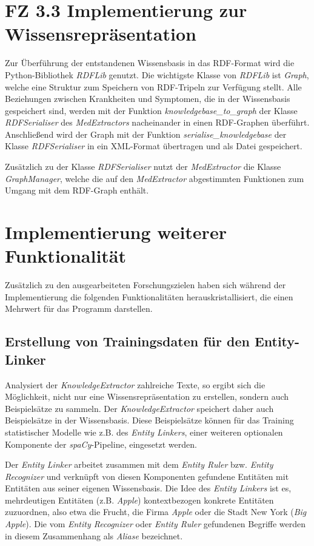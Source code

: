 \section{FZ 3.3 Implementierung zur Wissensrepräsentation}
\label{sec:FZ3.3} 

Zur Überführung der entstandenen Wissensbasis in das RDF-Format wird die Python-Bibliothek \emph{RDFLib} genutzt. Die wichtigste Klasse von \emph{RDFLib} ist \emph{Graph}, welche eine Struktur zum Speichern von RDF-Tripeln zur Verfügung stellt. Alle Beziehungen zwischen Krankheiten und Symptomen, die in der Wissensbasis gespeichert sind, werden mit der Funktion \emph{knowledgebase\_to\_graph} der Klasse \emph{RDFSerialiser} des \emph{MedExtractors} nacheinander in einen RDF-Graphen überführt. Anschließend wird der Graph mit der Funktion \emph{serialise\_knowledgebase} der Klasse \emph{RDFSerialiser} in ein XML-Format übertragen und als Datei gespeichert. 

Zusätzlich zu der Klasse \emph{RDFSerialiser} nutzt der \emph{MedExtractor} die Klasse \emph{GraphManager}, welche die auf den \emph{MedExtractor} abgestimmten Funktionen zum Umgang mit dem RDF-Graph enthält.

\section{Implementierung weiterer Funktionalität}

Zusätzlich zu den ausgearbeiteten Forschungszielen haben sich während der Implementierung die folgenden Funktionalitäten herauskristallisiert, die einen Mehrwert für das Programm darstellen.

\subsection{Erstellung von Trainingsdaten für den Entity-Linker}

Analysiert der \emph{KnowledgeExtractor} zahlreiche Texte, so ergibt sich die Möglichkeit, nicht nur eine Wissensrepräsentation zu erstellen, sondern auch Beispielsätze zu sammeln. Der \emph{KnowledgeExtractor} speichert daher auch Beispielsätze in der Wissensbasis. Diese Beispielsätze können für das Training statistischer Modelle wie z.B. des \emph{Entity Linkers}, einer weiteren optionalen Komponente der \emph{spaCy}-Pipeline, eingesetzt werden.

Der \emph{Entity Linker} arbeitet zusammen mit dem \emph{Entity Ruler} bzw. \emph{Entity Recognizer} und verknüpft von diesen Komponenten gefundene Entitäten mit Entitäten aus seiner eigenen Wissensbasis. Die Idee des \emph{Entity Linkers} ist es, mehrdeutigen Entitäten (z.B. \emph{Apple}) kontextbezogen konkrete Entitäten zuzuordnen, also etwa die Frucht, die Firma \emph{Apple} oder die Stadt New York (\emph{Big Apple}). Die vom \emph{Entity Recognizer} oder \emph{Entity Ruler} gefundenen Begriffe werden in diesem Zusammenhang als \emph{Aliase} bezeichnet.

